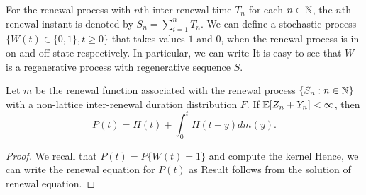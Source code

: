 \documentclass[a4paper,10pt,english]{article}
\begin{document}
For the renewal process with $n$th inter-renewal time $T_n$ for each $n \in \mathbb{N}$, the $n$th renewal instant is denoted by $S_n = \sum_{i=1}^nT_n$. 
We can define a stochastic process $\{W(t) \in \{0,1\}, t \geqslant 0\} $ that takes values $1$  and $0$, when the renewal process is in on and off state respectively. 
In particular, we can write 
It is easy to see that $W$ is a regenerative process with regenerative sequence $S$. 
\begin{thm}[on probability] 
\label{Thm:OnProbability}
Let $m$ be the renewal function associated with the renewal process $\{S_n: n \in \mathbb{N}\}$ with a non-lattice inter-renewal duration distribution $F$. 
If $\mathbb{E}[Z_n+Y_n]< \infty $, then
\begin{equation*}
P(t) = \bar{H}(t)+\int_{0}^{t}\bar{H}(t-y)dm(y).
\end{equation*}
\end{thm} 
\begin{proof} 
We recall that $P(t) = P\{W(t)=1\}$ and compute the kernel 
Hence, we can write the renewal equation for $P(t)$ as 
Result follows from the solution of renewal equation. %
\end{proof}
\end{document}
